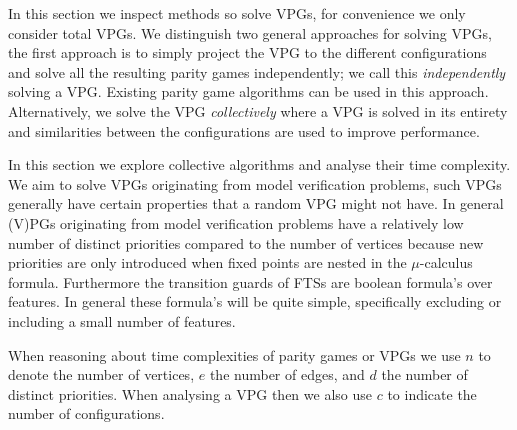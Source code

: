 In this section we inspect methods so solve VPGs, for convenience we only consider total VPGs. We distinguish two general approaches for solving VPGs, the first approach is to simply project the VPG to the different configurations and solve all the resulting parity games independently; we call this \textit{independently} solving a VPG. Existing parity game algorithms can be used in this approach. Alternatively, we solve the VPG \textit{collectively} where a VPG is solved in its entirety and similarities between the configurations are used to improve performance. 

In this section we explore collective algorithms and analyse their time complexity. We aim to solve VPGs originating from model verification problems, such VPGs generally have certain properties that a random VPG might not have. In general (V)PGs originating from model verification problems have a relatively low number of distinct priorities compared to the number of vertices because new priorities are only introduced when fixed points are nested in the $\mu$-calculus formula. Furthermore the transition guards of FTSs are boolean formula's over features. In general these formula's will be quite simple, specifically excluding or including a small number of features.

When reasoning about time complexities of parity games or VPGs we use $n$ to denote the number of vertices, $e$ the number of edges, and $d$ the number of distinct priorities. When analysing a VPG then we also use $c$ to indicate the number of configurations.
